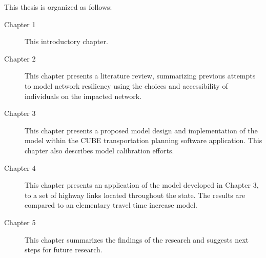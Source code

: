 \noindent This thesis is organized as follows:

\begin{description}
	\item [Chapter 1]	{This introductory chapter.}
	\item [Chapter 2]	{This chapter presents a literature review, summarizing previous attempts to model network resiliency using the choices and accessibility of individuals on the impacted network.}
	\item [Chapter 3]	{This chapter presents a proposed model design and implementation of the model within the CUBE transportation planning software application. This chapter also describes model calibration efforts.}
  \item [Chapter 4]	{This chapter presents an application of the model developed in Chapter 3, to a set of highway links located throughout the state. The results are compared to an elementary travel time increase model.}
	\item [Chapter 5]	{This chapter summarizes the findings of the research and suggests next steps for future research.}
\end{description}
